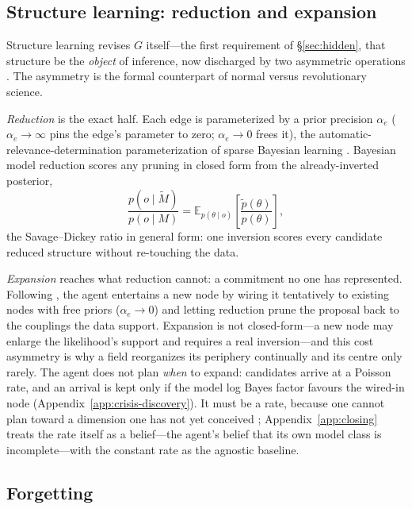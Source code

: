 \documentclass[runningheads]{llncs}
\newcommand{\Eq}[2]{\mathbb{E}_{#1}\!\left[#2\right]}
\begin{document}
\subsection{Structure learning: reduction and expansion}
\label{sec:structurelearning}

Structure learning revises $G$ itself---the first requirement of \S\ref{sec:hidden}, that
structure be the \emph{object} of inference, now discharged by two asymmetric operations
\citep{friston2017curiosity,smith2020structure}. The asymmetry is the formal counterpart of normal
versus revolutionary science.

\emph{Reduction} is the exact half. Each edge is parameterized by a prior precision $\alpha_e$
($\alpha_e\to\infty$ pins the edge's parameter to zero; $\alpha_e\to0$ frees it), the
automatic-relevance-determination parameterization of sparse Bayesian learning
\citep{mackay1992,tipping2001}. Bayesian model reduction \citep{friston2011,friston2018bmr} scores any
pruning in closed form from the already-inverted posterior,
\begin{equation}
\frac{p(o\mid\tilde M)}{p(o\mid M)}=\Eq{p(\theta\mid o)}{\frac{\tilde p(\theta)}{p(\theta)}},
\label{eq:bmr}
\end{equation}
the Savage--Dickey ratio in general form: one inversion scores every candidate reduced structure
without re-touching the data.

\emph{Expansion} reaches what reduction cannot: a commitment no one has represented. Following
\citet{friston2017curiosity}, the agent entertains a new node by wiring it tentatively to existing
nodes with free priors ($\alpha_e\to0$) and letting reduction prune the proposal back to the couplings
the data support. Expansion is not closed-form---a new node may enlarge the
likelihood's support and requires a real inversion---and this cost asymmetry is why a field
reorganizes its periphery continually and its centre only rarely. The agent does not plan \emph{when}
to expand: candidates arrive at a Poisson rate, and an arrival is kept only if the model log Bayes
factor favours the wired-in node (Appendix~\ref{app:crisis-discovery}). It must be a rate,
because one cannot plan toward a dimension one has not yet conceived \citep{stanford2006};
Appendix~\ref{app:closing} treats the rate itself as a belief---the agent's belief that its own
model class is incomplete---with the constant rate as the agnostic baseline.

\subsection{Forgetting}
\label{sec:temporal}
\end{document}
